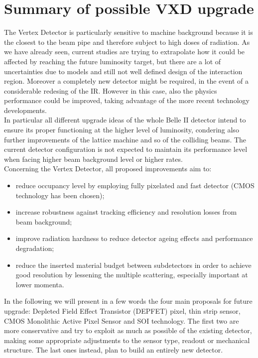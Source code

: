 \section{Summary of possible VXD upgrade}

The Vertex Detector is particularly sensitive to machine background because it is the closest to the beam pipe and therefore subject to high doses of radiation.
As we have already seen, current studies are trying to extrapolate how it could be affected by reaching the future luminosity target, but there are a lot of uncertainties due to models and still not well defined design of the interaction region. Moreover a completely new detector might be required, in the event of a considerable redesing of the IR. However in this case, also the physics performance could be improved, taking advantage of the more recent technology developments.\\

In particular all different upgrade ideas of the whole Belle II detector intend to ensure its proper functioning at the higher level of luminosity, condering also further improvements of the lattice machine and so of the colliding beams. The current detector configuration is not expected to maintain its performance level when facing higher beam background level or higher rates.\\

Concerning the Vertex Detector, all proposed improvements aim to:

\begin{itemize}
\item reduce occupancy level by employing fully pixelated and fast detector (CMOS technology has been chosen);
\item increase robustness against tracking efficiency and resolution losses from beam background;
\item improve radiation hardness to reduce detector ageing effects and performance degradation;
\item reduce the inserted material budget between subdetectors in order to achieve good resolution by lessening the multiple scattering, especially important at lower momenta.
\end{itemize}


In the following we will present in a few words the four main proposals for future upgrade: Depleted Field Effect Transistor (DEPFET) pixel, thin strip sensor, CMOS Monolithic Active Pixel Sensor and SOI technology.
The first two are more conservative and try to exploit as much as possible of the existing detector, making some appropriate adjustments to the sensor type, readout or mechanical structure. The last ones instead, plan to build an entirely new detector.\\

